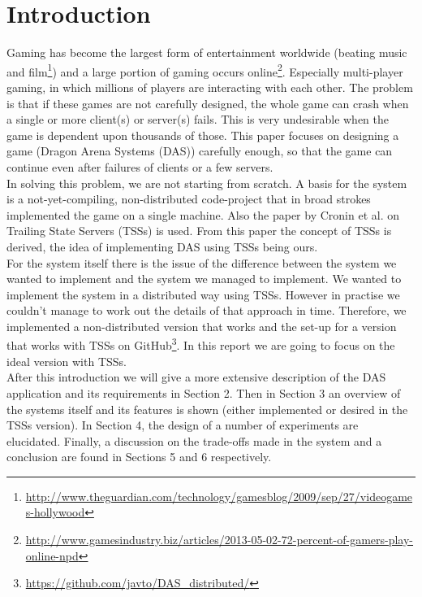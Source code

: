 \section{Introduction}
Gaming has become the largest form of entertainment worldwide (beating music and film\footnote{\url{http://www.theguardian.com/technology/gamesblog/2009/sep/27/videogames-hollywood}}) and a large portion of gaming occurs online\footnote{\url{http://www.gamesindustry.biz/articles/2013-05-02-72-percent-of-gamers-play-online-npd}}. Especially multi-player gaming, in which millions of players are interacting with each other. The problem is that if these games are not carefully designed, the whole game can crash when a single or more client(s) or server(s) fails. This is very undesirable when the game is dependent upon thousands of those. This paper focuses on designing a game (Dragon Arena Systems (DAS)) carefully enough, so that the game can continue even after failures of clients or a few servers.\\
In solving this problem, we are not starting from scratch. A basis for the system is a not-yet-compiling, non-distributed code-project that in broad strokes implemented the game on a single machine. Also the paper by Cronin et al. on Trailing State Servers (TSSs) is used. From this paper the concept of TSSs is derived, the idea of implementing DAS using TSSs being ours.\\
For the system itself there is the issue of the difference between the system we wanted to implement and the system we managed to implement. We wanted to implement the system in a distributed way using TSSs. However in practise we couldn't manage to work out the details of that approach in time. Therefore, we implemented a non-distributed version that works and the set-up for a version that works with TSSs on GitHub\footnote{\url{https://github.com/javto/DAS\_distributed/}}. In this report we are going to focus on the ideal version with TSSs. \\
After this introduction we will give a more extensive description of the DAS application and its requirements in Section 2. Then in Section 3 an overview of the systems itself and its features is shown (either implemented or desired in the TSSs version). In Section 4, the design of a number of experiments are elucidated. Finally, a discussion on the trade-offs made in the system and a conclusion are found in Sections 5 and 6 respectively.